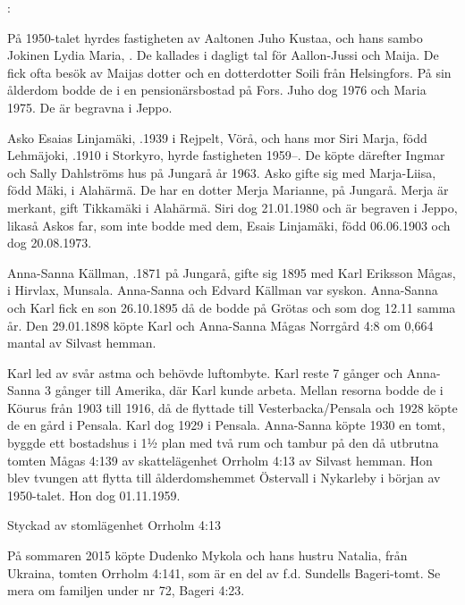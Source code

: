 :

På 1950-talet hyrdes fastigheten av Aaltonen Juho Kustaa,  och hans sambo Jokinen Lydia Maria, . De kallades i dagligt tal för Aallon-Jussi och Maija. De fick ofta besök av Maijas dotter och en dotterdotter Soili från Helsingfors. På sin ålderdom bodde de i en pensionärsbostad på Fors. Juho dog 1976 och Maria 1975. De är begravna i Jeppo.

Asko Esaias Linjamäki, .1939 i Rejpelt, Vörå, och hans mor Siri Marja, född Lehmäjoki, .1910 i Storkyro, hyrde fastigheten 1959--. De köpte därefter Ingmar och Sally Dahlströms hus på Jungarå år 1963.	Asko gifte sig med Marja-Liisa, född Mäki,  i Alahärmä. De har en dotter Merja Marianne,  på Jungarå. Merja är merkant, gift Tikkamäki i Alahärmä. Siri dog 21.01.1980 och är begraven i Jeppo, likaså Askos far, som inte bodde med dem, Esais Linjamäki, född 06.06.1903 och dog 20.08.1973.


Anna-Sanna Källman, .1871 på Jungarå, gifte sig 1895 med Karl Eriksson Mågas,  i Hirvlax, Munsala. Anna-Sanna och Edvard Källman var syskon. Anna-Sanna och Karl fick en son 26.10.1895 då de bodde på Grötas och som dog 12.11 samma år. Den 29.01.1898 köpte Karl och Anna-Sanna Mågas Norrgård 4:8 om 0,664 mantal av Silvast hemman.

Karl led av svår astma och behövde luftombyte. Karl reste 7 gånger och Anna-Sanna 3 gånger till Amerika, där Karl kunde arbeta. Mellan resorna bodde de i Köurus från 1903 till 1916, då de flyttade till Vesterbacka/Pensala och 1928 köpte de en gård i Pensala. Karl dog 1929 i Pensala. Anna-Sanna köpte 1930 en tomt, byggde ett bostadshus i 1½ plan med två rum och tambur på den då utbrutna	tomten Mågas 4:139 av skattelägenhet Orrholm 4:13 av Silvast hemman. Hon blev tvungen att flytta till ålderdomshemmet Östervall i Nykarleby i början av 1950-talet. Hon dog 01.11.1959.




Styckad av stomlägenhet Orrholm 4:13

På sommaren 2015 köpte Dudenko Mykola och hans hustru Natalia, från Ukraina, tomten Orrholm 4:141, som är en del av f.d. Sundells Bageri-tomt. Se mera om familjen under nr 72, Bageri 4:23.


